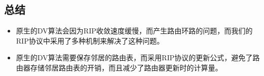 	\subsection{总结} %
	\label{sub:总结}
		\begin{itemize}
			\item 原生的DV算法会因为RIP收敛速度缓慢，而产生路由环路的问题，而我们的RIP协议中采用了多种机制来解决了这种问题。
			\item 原生的DV算法需要保存邻居的路由表，而采用RIP协议的更新公式，避免了路由器存储邻居路由表的开销，而且减少了路由器更新时的计算量。
		\end{itemize}
	


